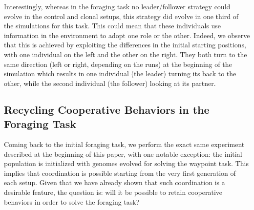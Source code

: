    Interestingly, whereas in the foraging task no leader/follower strategy could evolve in the control and clonal setups, this strategy did evolve in one third of the simulations for this task. This could mean that these individuals use information in the environment to adopt one role or the other. Indeed, we observe that this is achieved by exploiting the differences in the initial starting positions, with one individual on the left and the other on the right. They both turn to the same direction (left or right, depending on the runs) at the beginning of the simulation which results in one individual (the leader) turning its back to the other, while the second individual (the follower) looking at its partner. 


  \subsection{Recycling Cooperative Behaviors in the Foraging Task}

    Coming back to the initial foraging task, we perform the exact same experiment described at the beginning of this paper, with one notable exception: the initial population is initialized with genomes evolved for solving the waypoint task. This implies that coordination is possible starting from the very first generation of each setup. Given that we have already shown that such coordination is a desirable feature, the question is: will it be possible to retain cooperative behaviors in order to solve the foraging task?

    \begin{table}[h]
      \caption{\textbf{Evolution of a cooperative strategy.}
      Proportion of the 60 independent simulations where the best individual evolved a cooperative strategy (collecting purple targets) or a solitary strategy (collecting green targets) for each setup in the foraging task when individuals are previously evolved in the waypoints task. In addition, the repartition of the different strategies is indicated when cooperation evolved: \emph{Leader/Follower} (Lead.) or \emph{Turning} (Turn.).}
      \label{tab:RecyclingCoopBehaviors}
    \end{table}

